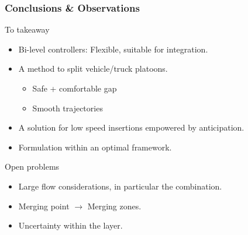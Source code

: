 \begin{frame}
    \frametitle{Conclusions \& Observations}
        \begin{block}{To takeaway}
          \begin{itemize}
            \item Bi-level controllers: Flexible, suitable for integration. 
            \item A method to  split vehicle/truck platoons.
                  \begin{itemize}
                    \item Safe + comfortable gap 
                    \item Smooth trajectories
                  \end{itemize} 
            \item A solution for low speed insertions empowered by anticipation. 
            \item Formulation within an optimal framework. 
          \end{itemize}
        \end{block}
        \begin{block}{Open problems}
        \begin{itemize}
          \item Large flow considerations, in particular the combination.
          \item Merging point \(\rightarrow\) Merging zones.
          \item Uncertainty within the  layer.
        \end{itemize}
        \end{block}
\end{frame}